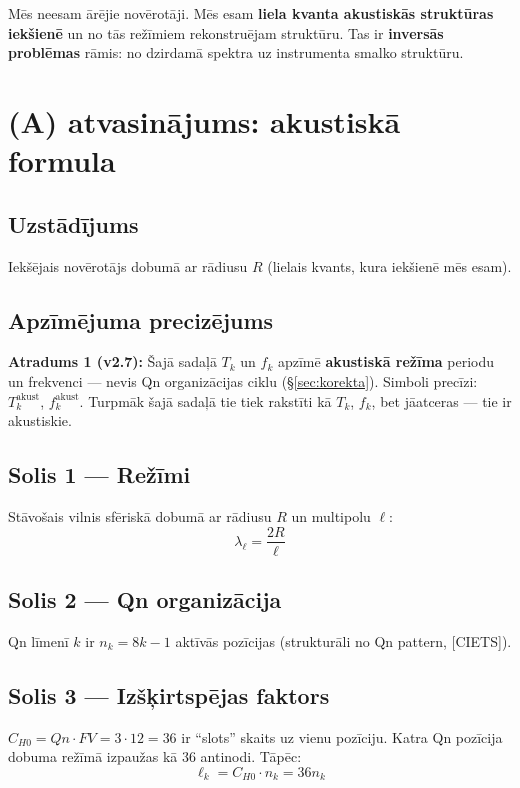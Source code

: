 \documentclass[12pt,a4paper]{article}
\begin{document}
Mēs neesam ārējie novērotāji. Mēs esam \textbf{liela kvanta akustiskās struktūras iekšienē} un no tās režīmiem rekonstruējam struktūru. Tas ir \textbf{inversās problēmas} rāmis: no dzirdamā spektra uz instrumenta smalko struktūru.

\newpage

\section{(A) atvasinājums: akustiskā formula}
\label{sec:atvasinajums}

\subsection*{Uzstādījums}

Iekšējais novērotājs dobumā ar rādiusu $R$ (lielais kvants, kura iekšienē mēs esam).

\subsection*{Apzīmējuma precizējums}

\textbf{Atradums 1 (v2.7):} Šajā sadaļā $T_k$ un $f_k$ apzīmē \textbf{akustiskā režīma} periodu un frekvenci — nevis Qn organizācijas ciklu (\S\ref{sec:korekta}). Simboli precīzi: $T_k^{\text{akust}}$, $f_k^{\text{akust}}$. Turpmāk šajā sadaļā tie tiek rakstīti kā $T_k$, $f_k$, bet jāatceras — tie ir akustiskie.

\subsection*{Solis 1 — Režīmi}

Stāvošais vilnis sfēriskā dobumā ar rādiusu $R$ un multipolu $\ell$:
\[
\lambda_\ell = \frac{2R}{\ell}
\]

\subsection*{Solis 2 — Qn organizācija}

Qn līmenī $k$ ir $n_k = 8k-1$ aktīvās pozīcijas (strukturāli no Qn pattern, [CIETS]).

\subsection*{Solis 3 — Izšķirtspējas faktors}

$C_{H0} = Qn \cdot FV = 3 \cdot 12 = 36$ ir ``slots'' skaits uz vienu pozīciju. Katra Qn pozīcija dobuma režīmā izpaužas kā 36 antinodi. Tāpēc:
\[
\ell_k = C_{H0} \cdot n_k = 36 n_k
\]
\end{document}
